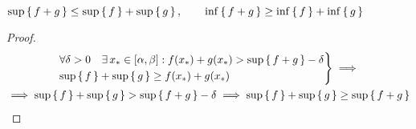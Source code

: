 \begin{statement}\label{st:1}
	$ \sup\set{f + g} \le \sup\set{f} + \sup\set{g}, \qquad \inf\set{f + g} \ge \inf\set{f} + \inf\set{g} $
\end{statement}
\begin{proof}
	\begin{multline*}
		\begin{rcases}
			\forall \delta > 0 \quad \exist x_* \in [\alpha, \beta] : f(x_*) + g(x_*) > \sup\set{f + g} - \delta \\
			\sup\set{f} + \sup\set{g} \ge f(x_*) + g(x_*)
		\end{rcases} \implies \\ \implies \sup\set{f} + \sup\set{g} > \sup\set{f + g} - \delta \implies \sup\set{f} + \sup\set{g} \ge \sup\set{f + g} $$
	\end{multline*}
\end{proof}

